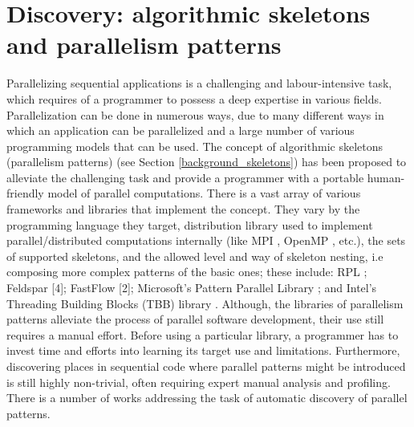\section{Discovery: algorithmic skeletons and parallelism patterns}
\label{related_work_as_and_pp}
\quad Parallelizing sequential applications is a challenging and labour-intensive task, which requires of a programmer to possess a deep expertise in various fields. Parallelization can be done in numerous ways, due to many different ways in which an application can be parallelized and a large number of various programming models that can be used. The concept of algorithmic skeletons (parallelism patterns) (see Section \ref{background_skeletons}) has been proposed to alleviate the challenging task and provide a programmer with a portable human-friendly model of parallel computations. There is a vast array of various frameworks and libraries that implement the concept. They vary by the programming language they target, distribution library used to implement parallel/distributed computations internally (like MPI \cite{mpi}, OpenMP \cite{openmp_specs}, etc.), the sets of supported skeletons, and the allowed level and way of skeleton nesting, i.e composing more complex patterns of the basic ones; these include: RPL \cite{7445342}; Feldspar [4]; FastFlow [2]; Microsoft’s Pattern Parallel Library \cite{microsoft-ppl}; and Intel’s Threading Building Blocks (TBB) library \cite{intel-tbb}.\newline\null
\quad Although, the libraries of parallelism patterns alleviate the process of parallel software development, their use still requires a manual effort. Before using a particular library, a programmer has to invest time and efforts into learning its target use and limitations. Furthermore, discovering places in
sequential code where parallel patterns might be introduced is
still highly non-trivial, often requiring expert manual analysis and profiling. There is a number of works addressing the task of automatic discovery of parallel patterns.\newline\null
